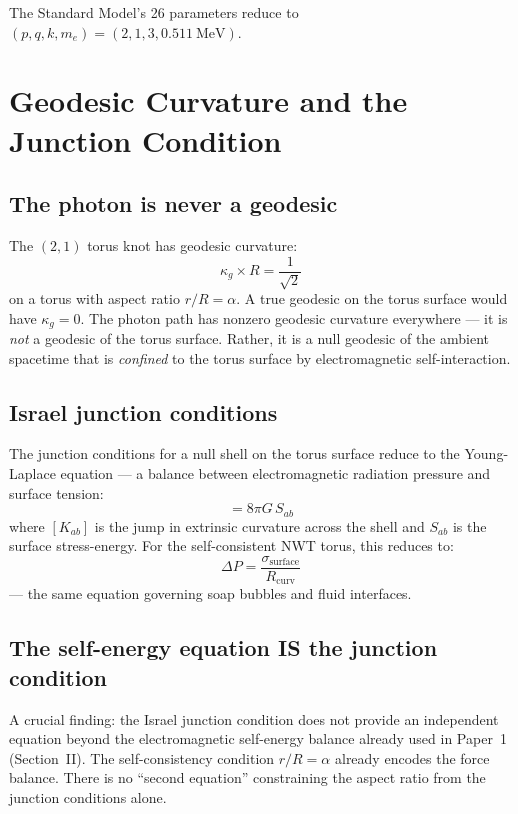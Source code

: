\documentclass[11pt,a4paper]{article}
\begin{document}
The Standard Model's 26 parameters reduce to $(p, q, k, m_e) = (2, 1, 3, 0.511~\text{MeV})$.

\section{Geodesic Curvature and the Junction Condition}
\label{sec:junction}

\subsection{The photon is never a geodesic}

The $(2,1)$ torus knot has geodesic curvature:
\begin{equation}
  \kappa_g \times R = \frac{1}{\sqrt{2}}
\end{equation}
on a torus with aspect ratio $r/R = \alpha$. A true geodesic on the torus surface would have $\kappa_g = 0$. The photon path has nonzero geodesic curvature everywhere --- it is \emph{not} a geodesic of the torus surface. Rather, it is a null geodesic of the ambient spacetime that is \emph{confined} to the torus surface by electromagnetic self-interaction.

\subsection{Israel junction conditions}

The junction conditions for a null shell on the torus surface reduce to the Young-Laplace equation --- a balance between electromagnetic radiation pressure and surface tension:
\begin{equation}
  [K_{ab}] = 8\pi G\, S_{ab}
\end{equation}
where $[K_{ab}]$ is the jump in extrinsic curvature across the shell and $S_{ab}$ is the surface stress-energy. For the self-consistent NWT torus, this reduces to:
\begin{equation}
  \Delta P = \frac{\sigma_{\text{surface}}}{R_{\text{curv}}}
\end{equation}
--- the same equation governing soap bubbles and fluid interfaces.

\subsection{The self-energy equation IS the junction condition}

A crucial finding: the Israel junction condition does not provide an independent equation beyond the electromagnetic self-energy balance already used in Paper~1 (Section~II). The self-consistency condition $r/R = \alpha$ already encodes the force balance. There is no ``second equation'' constraining the aspect ratio from the junction conditions alone.
\end{document}
